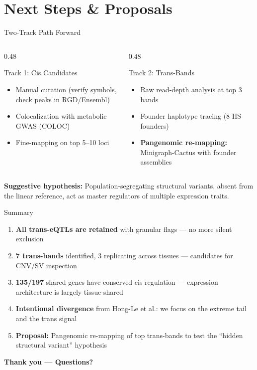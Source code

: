 \documentclass[aspectratio=169,11pt]{beamer}
\begin{document}
\section{Next Steps \& Proposals}
\begin{frame}{Two-Track Path Forward}
\begin{columns}
\begin{column}{0.48\textwidth}
\begin{block}{Track 1: Cis Candidates}
\begin{itemize}
    \item Manual curation (verify symbols, check peaks in RGD/Ensembl)
    \item Colocalization with metabolic GWAS (COLOC)
    \item Fine-mapping on top 5--10 loci
\end{itemize}
\end{block}
\end{column}
\begin{column}{0.48\textwidth}
\begin{block}{Track 2: Trans-Bands}
\begin{itemize}
    \item Raw read-depth analysis at top 3 bands
    \item Founder haplotype tracing (8 HS founders)
    \item \textbf{Pangenomic re-mapping:} Minigraph-Cactus with founder assemblies
\end{itemize}
\end{block}
\end{column}
\end{columns}
\vspace{0.3cm}
\centering
\textbf{Suggestive hypothesis:} Population-segregating structural variants, absent from the linear reference, act as master regulators of multiple expression traits.
\end{frame}

\begin{frame}{Summary}
\begin{enumerate}
    \item \textbf{All trans-eQTLs are retained} with granular flags --- no more silent exclusion
    \item \textbf{7 trans-bands} identified, 3 replicating across tissues --- candidates for CNV/SV inspection
    \item \textbf{135/197} shared genes have conserved cis regulation --- expression architecture is largely tissue-shared
    \item \textbf{Intentional divergence} from Hong-Le et al.: we focus on the extreme tail and the trans signal
    \item \textbf{Proposal:} Pangenomic re-mapping of top trans-bands to test the ``hidden structural variant'' hypothesis
\end{enumerate}
\vspace{0.3cm}
\centering
\Large \textbf{Thank you --- Questions?}
\end{frame}
\end{document}
